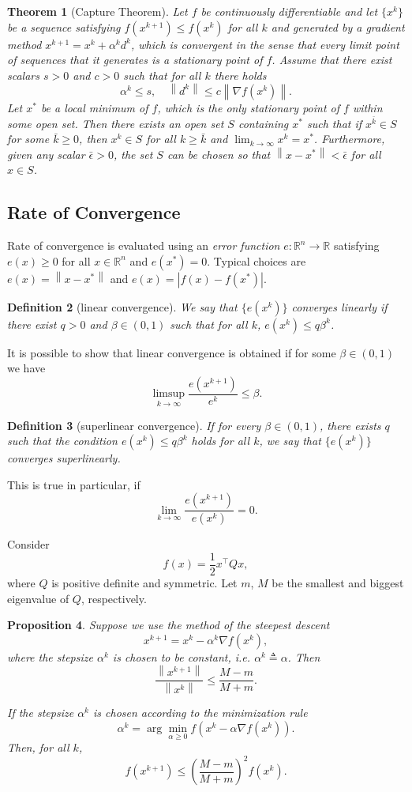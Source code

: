 \documentclass[12pt,a4paper]{article}
\numberwithin{equation}{section}
\theoremstyle{mystyle}
\newtheorem{definition}{Definition}[section]
\newtheorem{theorem}[definition]{Theorem}
\newtheorem{proposition}[definition]{Proposition}
\newcommand{\R}{\mathbb{R}}
\newcommand{\grad}{\nabla}
\newcommand{\T}{\top}
\newcommand{\abs}[1]{\left\lvert #1 \right\rvert}
\newcommand{\norm}[1]{\left\lVert #1 \right\rVert}
\begin{document}
	\begin{theorem}[Capture Theorem]
		Let $f$ be continuously differentiable and let $\{x^k\}$ be a sequence satisfying $f(x^{k+1})\leq f(x^k)$ for all $k$ and generated by a gradient method $x^{k+1}=x^k +\alpha^k d^k$, which is convergent in the sense that every limit point of sequences that it generates is a stationary point of $f$. Assume that there exist scalars $s>0$ and $c>0$ such that for all $k$ there holds
		$$
		\alpha^k \leq s,\quad \norm{d^k}\leq c\norm{\grad f(x^k)}.
		$$
		Let $x^*$ be a local minimum of $f$, which is the only stationary point of $f$ within some open set. Then there exists an open set $S$ containing $x^*$ such that if $x^{\bar{k}}\in S$ for some $\bar{k}\geq 0$, then $x^k\in S$ for all $k\geq \bar{k}$ and $\lim_{k\to\infty}x^k=x^*$. Furthermore, given any scalar $\bar{\epsilon}>0$, the set $S$ can be chosen so that $\norm{x-x^*}<\bar{\epsilon}$ for all $x\in S$.
	\end{theorem}
	
	\subsection{Rate of Convergence}
	Rate of convergence is evaluated using an \emph{error function} $e: \R^n \to \R$ satisfying $e(x)\geq 0$ for all $x\in \R^n$ and $e(x^*)=0$. Typical choices are $e(x)=\norm{x-x^*}$ and $e(x)=\abs{f(x)-f(x^*)}$.

	\begin{definition}[linear convergence]
		We say that $\{e(x^k)\}$ converges \emph{linearly} if there exist $q>0$ and $\beta\in (0,1)$ such that for all $k$, $e(x^k)\leq q \beta^k$.
	\end{definition}
	 It is possible to show that linear convergence is obtained if for some $\beta \in (0,1)$ we have
	 $$
	 \limsup_{k\to\infty}\frac{e(x^{k+1})}{e^{k}}\leq \beta.
	 $$
	 \begin{definition}[superlinear convergence]
	 	If for every $\beta\in (0,1)$, there exists $q$ such that the condition $e(x^k)\leq q\beta^k$ holds for all $k$, we say that $\{e(x^k)\}$ converges \emph{superlinearly}.
	 \end{definition}
	This is true in particular, if 
	$$
	\lim_{k\to\infty}\frac{e(x^{k+1})}{e(x^k)}=0.
	$$
	
	Consider 
	$$f(x)=\frac{1}{2}x^\T Q x,$$ where $Q$ is positive definite and symmetric. Let $m$, $M$ be the smallest and biggest eigenvalue of $Q$, respectively.
	\begin{proposition}
		Suppose we use the method of the steepest descent 
		$$
		x^{k+1}=x^k -\alpha^k \grad f(x^k),
		$$
		where the stepsize $\alpha^k$ is chosen to be constant, i.e. $\alpha^k \triangleq \alpha$. Then
		$$
		\frac{\norm{x^{k+1}}}{\norm{x^k}}\leq \frac{M-m}{M+m}.
		$$
		
		If the stepsize $\alpha^k$ is chosen according to the minimization rule
		$$
		\alpha^k=\arg\min_{\alpha\geq 0}f(x^k-\alpha \grad f(x^k)).
		$$
		Then, for all $k$,
		$$
		f(x^{k+1})\leq \left(\frac{M-m}{M+m}\right)^2 f(x^k).
		$$
	\end{proposition}
	\appendix
	
	 
\end{document}
